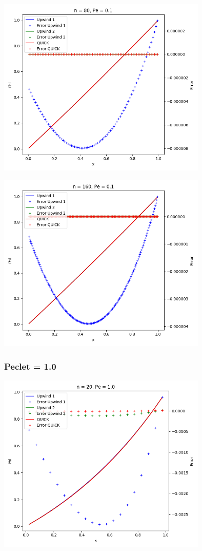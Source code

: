 \documentclass[11pt]{article}
\begin{document}
\begin{center}
\includegraphics[width=10cm]{./figures/n80pe01.png}
\end{center}

\begin{center}
\includegraphics[width=10cm]{./figures/n160pe01.png}
\end{center}

\subsubsection{Peclet = 1.0}
\label{sec:org919cbac}
\begin{center}
\includegraphics[width=10cm]{./figures/n20pe1.png}
\end{center}
\end{document}
